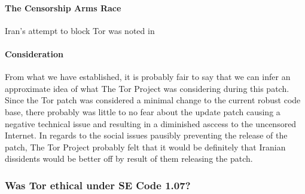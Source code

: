 \documentclass[11pt]{article}
\begin{document}
\begin{multicols}{2}
\paragraph{The Censorship Arms Race}

Iran's attempt to block Tor was noted in 

\paragraph{Consideration}

From what we have established, it is probably fair to say that we can infer an
approximate idea of what The Tor Project was considering during this patch.
Since the Tor patch was considered a minimal change to the current robust code
base, there probably was little to no fear about the update patch causing a
negative technical issue and resulting in a diminished asccess to the uncensored
Internet.  In regards to the social issues pausibly preventing the release of
the patch, The Tor Project probably felt that it would be definitely that
Iranian dissidents would be better off by result of them releasing the patch.





\subsubsection{Was Tor ethical under SE Code 1.07?}






\end{multicols}
\end{document}
